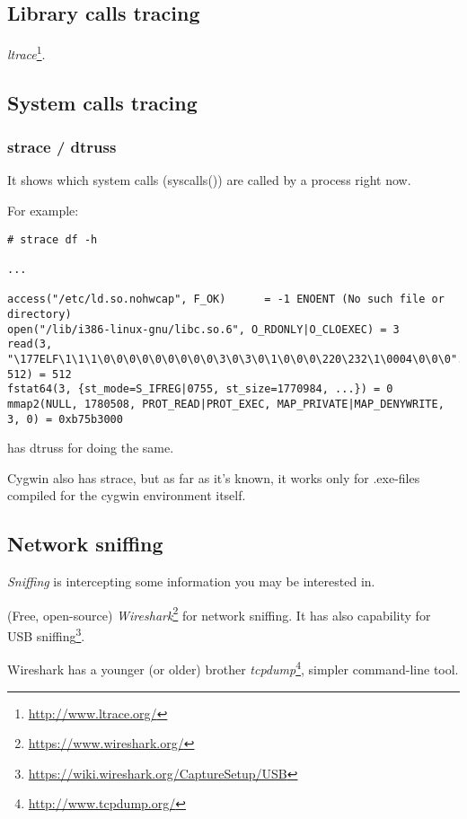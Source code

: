 \subsection{Library calls tracing}

\emph{ltrace}\footnote{\url{http://www.ltrace.org/}}.

\subsection{System calls tracing}

\label{strace}
\subsubsection{strace / dtruss}

It shows which system calls (syscalls()) are called by a process right now.

For example:

\begin{lstlisting}
# strace df -h

...

access("/etc/ld.so.nohwcap", F_OK)      = -1 ENOENT (No such file or directory)
open("/lib/i386-linux-gnu/libc.so.6", O_RDONLY|O_CLOEXEC) = 3
read(3, "\177ELF\1\1\1\0\0\0\0\0\0\0\0\0\3\0\3\0\1\0\0\0\220\232\1\0004\0\0\0"..., 512) = 512
fstat64(3, {st_mode=S_IFREG|0755, st_size=1770984, ...}) = 0
mmap2(NULL, 1780508, PROT_READ|PROT_EXEC, MAP_PRIVATE|MAP_DENYWRITE, 3, 0) = 0xb75b3000
\end{lstlisting}

\myindex{\MacOSX}
\MacOSX has dtruss for doing the same.

Cygwin also has strace, but as far as it's known, it works only for .exe-files
compiled for the cygwin environment itself.

\subsection{Network sniffing}

\emph{Sniffing} is intercepting some information you may be interested in.

(Free, open-source) \emph{Wireshark}\footnote{\url{https://www.wireshark.org/}} for network sniffing.
It has also capability for USB sniffing\footnote{\url{https://wiki.wireshark.org/CaptureSetup/USB}}.

Wireshark has a younger (or older) brother \emph{tcpdump}\footnote{\url{http://www.tcpdump.org/}}, simpler command-line tool.

